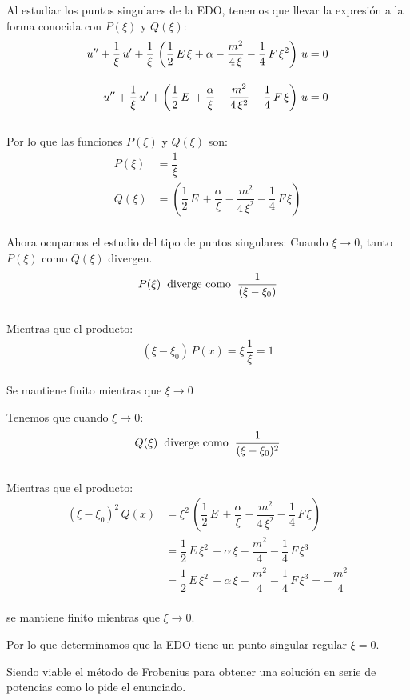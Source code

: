 Al estudiar los puntos singulares de la EDO, tenemos que llevar la expresión a la forma conocida con $P(\xi)$ y $Q(\xi)$:
\begin{align*}
{u}^{\prime \prime} + \dfrac{1}{\xi} \, {u}^{\prime} + \dfrac{1}{\xi} \, \left( \dfrac{1}{2} \, E \, \xi + \alpha - \dfrac{m^{2}}{4 \, \xi} - \dfrac{1}{4} \, F \, \xi^{2} \right) \, u = 0 \\[1em]
{u}^{\prime \prime} + \dfrac{1}{\xi} \, {u}^{\prime} + \left( \dfrac{1}{2} \, E \, + \dfrac{\alpha}{\xi} - \dfrac{m^{2}}{4 \, \xi^{2}} - \dfrac{1}{4} \, F \, \xi \right) \, u = 0
\end{align*}
\\
Por lo que las funciones $P(\xi)$ y $Q(\xi)$ son:
\begin{align*}
P(\xi) &= \dfrac{1}{\xi} \\[1em]
Q(\xi) &= \left( \dfrac{1}{2} \, E \, + \dfrac{\alpha}{\xi} - \dfrac{m^{2}}{4 \, \xi^{2}} - \dfrac{1}{4} \, F \, \xi \right)
\end{align*}
\\
Ahora ocupamos el estudio del tipo de puntos singulares: Cuando $\xi \to 0$, tanto $P(\xi)$ como $Q(\xi)$ divergen.
\begin{align*}
P(\xi) \hspace{0.2cm} \mbox{diverge como} \hspace{0.2cm} \dfrac{1}{(\xi - \xi_{0})}
\end{align*}
\\
Mientras que el producto:
\begin{align*}
(\xi - \xi_{0}) \, P(x) = \xi \, \dfrac{1}{\xi} = 1
\end{align*}
\\
Se mantiene finito mientras que $\xi \to 0$
\par
Tenemos que cuando $\xi \to 0$:
\begin{align*}
Q(\xi) \hspace{0.2cm} \mbox{diverge como} \hspace{0.2cm} \dfrac{1}{(\xi - \xi_{0})^{2}}
\end{align*}
\\
Mientras que el producto:
\begin{align*}
(\xi - \xi_{0})^{2} \, Q(x) &= \xi^{2} \, \left( \dfrac{1}{2} \, E \, + \dfrac{\alpha}{\xi} - \dfrac{m^{2}}{4 \, \xi^{2}} - \dfrac{1}{4} \, F \, \xi \right) \\[1em]
&= \dfrac{1}{2} \, E \, \xi^{2} \, + \alpha \, \xi - \dfrac{m^{2}}{4} - \dfrac{1}{4} \, F \, \xi^{3} \\[1em]
&= \dfrac{1}{2} \, E \, \xi^{2} \, + \alpha \, \xi - \dfrac{m^{2}}{4} - \dfrac{1}{4} \, F \, \xi^{3} = - \dfrac{m^{2}}{4}
\end{align*}
\\
se mantiene finito mientras que $\xi \to 0$.
\par
Por lo que determinamos que la EDO tiene un punto singular regular $\xi = 0$.
\par
Siendo viable el método de Frobenius para obtener una solución en serie de potencias como lo pide el enunciado.

